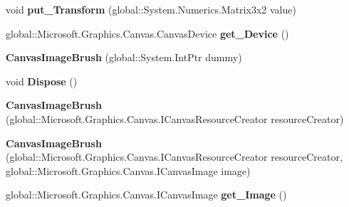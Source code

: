 \begin{DoxyCompactItemize}
void {\bfseries put\+\_\+\+Transform} (global\+::\+System.\+Numerics.\+Matrix3x2 value)
\item 
\mbox{\label{class_microsoft_1_1_graphics_1_1_canvas_1_1_brushes_1_1_canvas_image_brush_abbc8ded9bdef5ad7ab6029fa7bc1eef6}} 
global\+::\+Microsoft.\+Graphics.\+Canvas.\+Canvas\+Device {\bfseries get\+\_\+\+Device} ()
\item 
\mbox{\label{class_microsoft_1_1_graphics_1_1_canvas_1_1_brushes_1_1_canvas_image_brush_acbfe907c1015a95d93b5213836119f03}} 
{\bfseries Canvas\+Image\+Brush} (global\+::\+System.\+Int\+Ptr dummy)
\item 
\mbox{\label{class_microsoft_1_1_graphics_1_1_canvas_1_1_brushes_1_1_canvas_image_brush_a287a8959ebff5767a97c27bfd52ec3b7}} 
void {\bfseries Dispose} ()
\item 
\mbox{\label{class_microsoft_1_1_graphics_1_1_canvas_1_1_brushes_1_1_canvas_image_brush_adbb56b8d19fbd4dfd899d515aba49f92}} 
{\bfseries Canvas\+Image\+Brush} (global\+::\+Microsoft.\+Graphics.\+Canvas.\+I\+Canvas\+Resource\+Creator resource\+Creator)
\item 
\mbox{\label{class_microsoft_1_1_graphics_1_1_canvas_1_1_brushes_1_1_canvas_image_brush_aeb29fd1437d8ae16d2fe8546010eb7db}} 
{\bfseries Canvas\+Image\+Brush} (global\+::\+Microsoft.\+Graphics.\+Canvas.\+I\+Canvas\+Resource\+Creator resource\+Creator, global\+::\+Microsoft.\+Graphics.\+Canvas.\+I\+Canvas\+Image image)
\item 
\mbox{\label{class_microsoft_1_1_graphics_1_1_canvas_1_1_brushes_1_1_canvas_image_brush_acd493d96591a7820f9e9bada709041ad}} 
global\+::\+Microsoft.\+Graphics.\+Canvas.\+I\+Canvas\+Image {\bfseries get\+\_\+\+Image} ()
\item 
\mbox{\label{class_microsoft_1_1_graphics_1_1_canvas_1_1_brushes_1_1_canvas_image_brush_af68d570f7be103d2a799285c816315c9}} 

\end{DoxyCompactItemize}
